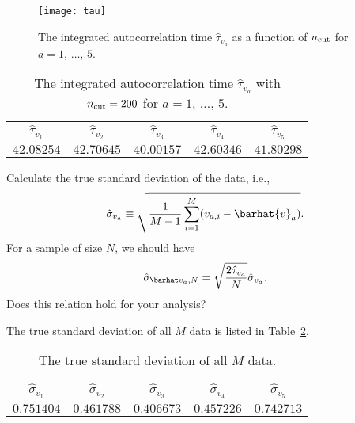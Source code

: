 \begin{figure}[h]
    \centering
    \texttt{[image: tau]}
    \caption{The integrated autocorrelation time $\hat{\tau}_{v_a}$ as a
        function of $n_\textnormal{cut}$ for $a = 1$, $\ldots$, $5$.}
    \label{fig:tau}
\end{figure}

\begin{table}
    \centering
    \caption{The integrated autocorrelation time $\hat{\tau}_{v_a}$ with
        $n_\textnormal{cut} = 200$ for $a = 1$, $\ldots$, $5$.}
    \label{tab:tau}
    \begin{tabular}{@{}ccccc@{}}
        \toprule
        $\hat{\tau}_{v_1}$ & $\hat{\tau}_{v_2}$ & $\hat{\tau}_{v_3}$ & $\hat{\tau}_{v_4}$ & $\hat{\tau}_{v_5}$ \\
        \midrule
        $42.08254$         & $42.70645$         & $40.00157$         & $42.60346$         & $41.80298$         \\
        \bottomrule
    \end{tabular}
\end{table}

\Question{} Calculate the true standard deviation of the data, i.e.,
%
\begin{equation}
    \hat{\sigma}_{v_a} \equiv \sqrt{\frac{ 1 }{ M - 1 }
        \sum_{i=1}^M (v_{a,i} - \barhat{v}_a)}.
\end{equation}
%
For a sample of size $N$, we should have
%
\begin{equation}
    \sgbar{a} = \sqrt{\frac{ 2 \hat{\tau}_{v_a} }{ N }} \hat{\sigma}_{v_a}.
\end{equation}
%
Does this relation hold for your analysis?

\Answer{}
The true standard deviation of all $M$ data is listed in Table~\ref{tab:std}.

\begin{table}[H]
    \centering
    \caption{The true standard deviation of all $M$ data.}
    \label{tab:std}
    \begin{tabular}{@{}ccccc@{}}
        \toprule
        $\hat{\sigma}_{v_1}$ & $\hat{\sigma}_{v_2}$ & $\hat{\sigma}_{v_3}$ & $\hat{\sigma}_{v_4}$ & $\hat{\sigma}_{v_5}$ \\
        \midrule
        $0.751404$           & $0.461788$           & $0.406673$           & $0.457226$           & $0.742713$           \\
        \bottomrule
    \end{tabular}
\end{table}

